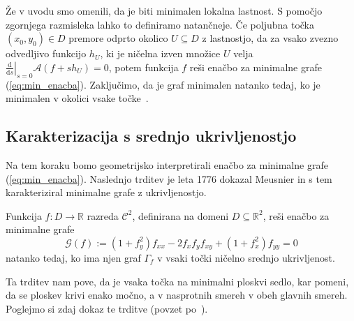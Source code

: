 \documentclass[fin1, tisk, bibtex]{fmfdelo}
\begin{document}
\begin{opomba}
    Že v uvodu smo omenili, da je \glqq biti minimalen\grqq{} lokalna lastnost. S pomočjo zgornjega razmisleka lahko to definiramo natančneje.
    Če poljubna točka $\left(x_0, y_0\right) \in D$ premore odprto okolico $U \subseteq D$ z lastnostjo, da za vsako zvezno odvedljivo funkcijo $h_U$, ki je ničelna izven množice $U$ velja $\left.\frac{\mathrm{d}}{\mathrm{d} s}\right|_{s=0} \mathcal{A}\left(f+s h_U\right)=0$, potem funkcija $f$ reši enačbo za minimalne grafe (\ref{eq:min_enacba}). Zaključimo, da je graf minimalen natanko tedaj, ko je minimalen v okolici vsake točke~\cite[str.~16]{Vrhovnik_2022}.
\end{opomba}


\subsection{Karakterizacija s srednjo ukrivljenostjo}

Na tem koraku bomo geometrijsko interpretirali enačbo za minimalne grafe (\ref{eq:min_enacba}). Naslednjo trditev je leta 1776 dokazal Meusnier in s tem karakteriziral minimalne grafe z ukrivljenostjo. 

\begin{trditev} \label{thm:srednja_ukrivljenost}
    Funkcija $f: D \rightarrow \mathbb{R}$ razreda $\mathcal{C}^2$, definirana na domeni $D \subseteq \mathbb{R}^2$, reši enačbo za minimalne grafe 
    \begin{equation}
        \mathcal{G}(f):=\left(1+f_y^2\right) f_{x x}-2 f_x f_y f_{x y}+\left(1+f_x^2\right) f_{y y}=0 \label{eq:trvitev1}
    \end{equation}
    natanko tedaj, ko ima njen graf $\Gamma_f$ v vsaki točki  ničelno srednjo ukrivljenost. 
\end{trditev}

Ta trditev nam pove, da je vsaka točka na minimalni ploskvi sedlo, kar pomeni, da se ploskev krivi enako močno, a v nasprotnih smereh v obeh glavnih smereh. Poglejmo si zdaj dokaz te trditve (povzet po~\cite[str.~6]{fosternicmin}).
\end{document}

